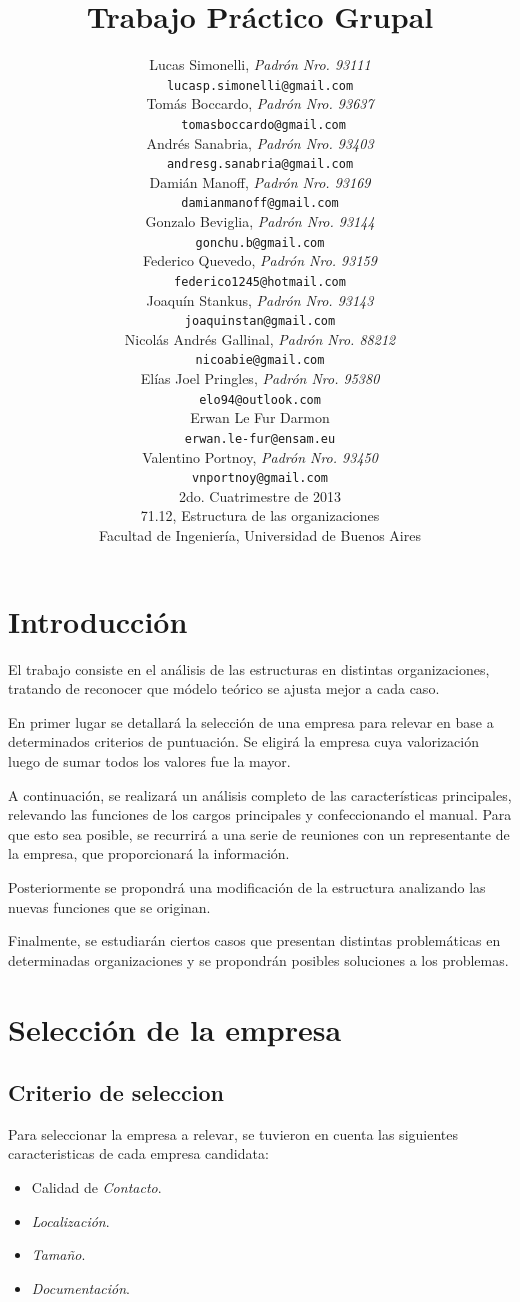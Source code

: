 \documentclass[a4paper,10pt]{article}
\title{		\textbf{Trabajo Práctico Grupal}}
\author{	Lucas Simonelli, \textit{Padrón Nro. 93111}                     \\
            \texttt{ lucasp.simonelli@gmail.com }                                              \\[2.5ex]
            Tomás Boccardo, \textit{Padrón Nro. 93637}                     \\
            \texttt{ tomasboccardo@gmail.com}                                              \\[2.5ex]
            Andrés Sanabria, \textit{Padrón Nro. 93403}                     \\
            \texttt{ andresg.sanabria@gmail.com  }                                              \\[2.5ex]
            Damián Manoff, \textit{Padrón Nro. 93169}                     \\
            \texttt{ damianmanoff@gmail.com  }                                              \\[2.5ex]
            Gonzalo Beviglia, \textit{Padrón Nro. 93144}                     \\
            \texttt{ gonchu.b@gmail.com  }                                              \\[2.5ex]
            Federico Quevedo, \textit{Padrón Nro. 93159}                     \\
            \texttt{ federico1245@hotmail.com  }                                              \\[2.5ex]
            Joaquín Stankus, \textit{Padrón Nro. 93143}                     \\
            \texttt{ joaquinstan@gmail.com  }                                              \\[2.5ex]
            Nicolás Andrés Gallinal, \textit{Padrón Nro. 88212}                \\
            \texttt{ nicoabie@gmail.com }                                              \\[2.5ex]
            Elías Joel Pringles, \textit{Padrón Nro. 95380}                \\
            \texttt{ elo94@outlook.com }                                              \\[2.5ex]   
          Erwan Le Fur Darmon								               \\
            \texttt{ erwan.le-fur@ensam.eu }                                              \\[2.5ex]   
Valentino Portnoy, \textit{Padrón Nro. 93450}                     \\
            \texttt{ vnportnoy@gmail.com  }                                              \\[2.5ex]
            \normalsize{2do. Cuatrimestre de 2013}                                      \\
            \normalsize{71.12, Estructura de las organizaciones}  \\
            \normalsize{Facultad de Ingeniería, Universidad de Buenos Aires}            \\
       }
\date{}
\begin{document}
\maketitle
\thispagestyle{empty}   %


\newpage
\tableofcontents
\newpage
\section{Introducción}
El trabajo consiste en el análisis de las estructuras en distintas organizaciones, tratando de reconocer que módelo teórico se ajusta mejor a cada caso.

En primer lugar se detallará la selección de una empresa para relevar en base a determinados criterios de puntuación. Se eligirá la empresa cuya valorización luego de sumar todos los valores fue la mayor.

A continuación, se realizará un análisis completo de las características principales, relevando las funciones de los cargos principales y confeccionando el manual. Para que esto sea posible, se recurrirá a una serie de reuniones con un representante de la empresa, que proporcionará la información.

Posteriormente se propondrá una modificación de la estructura analizando las nuevas funciones que se originan.

Finalmente, se estudiarán ciertos casos que presentan distintas problemáticas en determinadas organizaciones y se propondrán posibles soluciones a los problemas.

\newpage
\section{Selección de la empresa}

\subsection{Criterio de seleccion}

Para seleccionar la empresa a relevar, se tuvieron en cuenta las siguientes caracteristicas de cada empresa candidata:

\begin{itemize}
\item Calidad de \emph{Contacto}. 
\item \emph{Localización}.
\item \emph{Tamaño}.
\item \emph{Documentación}. 
\end{itemize}
\end{document}
